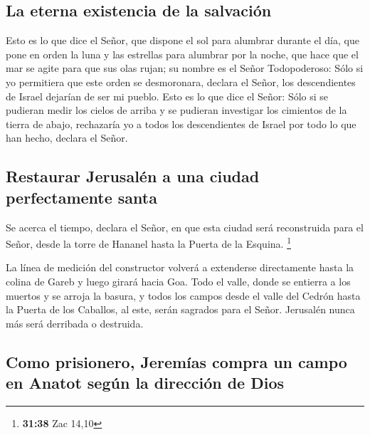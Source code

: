 \hypertarget{la-eterna-existencia-de-la-salvaciuxf3n}{%
\subsection{La eterna existencia de la
salvación}\label{la-eterna-existencia-de-la-salvaciuxf3n}}

 Esto es lo que dice el Señor, que dispone el sol para
alumbrar durante el día, que pone en orden la luna y las estrellas para
alumbrar por la noche, que hace que el mar se agite para que sus olas
rujan; su nombre es el Señor Todopoderoso:  Sólo si yo
permitiera que este orden se desmoronara, declara el Señor, los
descendientes de Israel dejarían de ser mi pueblo.  Esto
es lo que dice el Señor: Sólo si se pudieran medir los cielos de arriba
y se pudieran investigar los cimientos de la tierra de abajo, rechazaría
yo a todos los descendientes de Israel por todo lo que han hecho,
declara el Señor.

\hypertarget{restaurar-jerusaluxe9n-a-una-ciudad-perfectamente-santa}{%
\subsection{Restaurar Jerusalén a una ciudad perfectamente
santa}\label{restaurar-jerusaluxe9n-a-una-ciudad-perfectamente-santa}}

 Se acerca el tiempo, declara el Señor, en que esta
ciudad será reconstruida para el Señor, desde la torre de Hananel hasta
la Puerta de la Esquina. \footnote{\textbf{31:38} Zac 14,10}

 La línea de medición del constructor volverá a
extenderse directamente hasta la colina de Gareb y luego girará hacia
Goa.  Todo el valle, donde se entierra a los muertos y se
arroja la basura, y todos los campos desde el valle del Cedrón hasta la
Puerta de los Caballos, al este, serán sagrados para el Señor. Jerusalén
nunca más será derribada o destruida.

\hypertarget{como-prisionero-jeremuxedas-compra-un-campo-en-anatot-seguxfan-la-direcciuxf3n-de-dios}{%
\subsection{Como prisionero, Jeremías compra un campo en Anatot según la
dirección de
Dios}\label{como-prisionero-jeremuxedas-compra-un-campo-en-anatot-seguxfan-la-direcciuxf3n-de-dios}}

